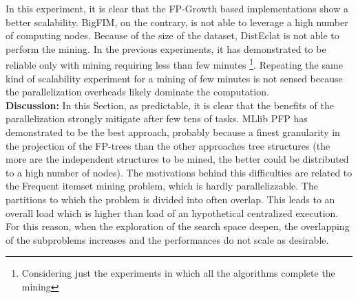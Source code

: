 In this experiment, it is clear that the FP-Growth based implementations show a better scalability. BigFIM, on the contrary, is not able to leverage a high number of computing nodes. 
Because of the size of the dataset, DistEclat is not able to perform the mining. In the previous experiments, it has demonstrated to be reliable only with mining requiring less than few minutes \footnote{Considering just the experiments in which all the algorithms complete the mining}. Repeating the same kind of scalability experiment for a mining of few minutes is not sensed because the parallelization overheads likely dominate the computation.\\
%
\textbf{Discussion:}
In this Section, as predictable, it is clear that the benefits of the parallelization strongly mitigate after few tens of tasks. MLlib PFP has demonstrated to be the best approach, probably because a finest granularity in the projection of the FP-trees than the other approaches tree structures (the more are the independent structures to be mined, the better could be distributed to a high number of nodes). 
The motivations behind this difficulties are related to the Frequent itemset mining problem, which is hardly parallelizzable. The partitions to which the problem is divided into often overlap. This leads to an overall load which is higher than load of an hypothetical centralized execution. For this reason, when the exploration of the search space deepen, the overlapping of the subproblems increases and the performances do not scale as desirable. 
